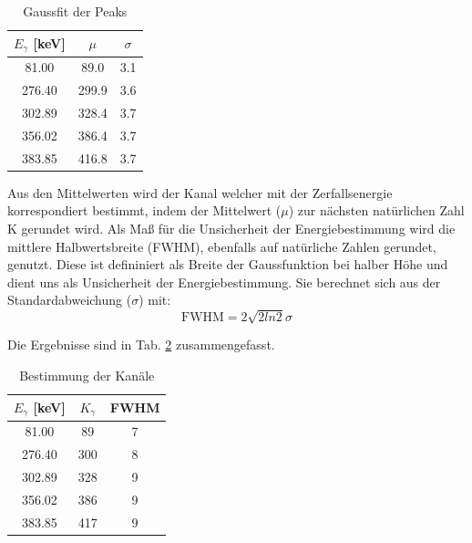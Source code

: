 \begin{table}[h]
\centering
\begin{tabular}{|c | c |c |}
\hline
$E_{\gamma}$ [\si{\kilo\electronvolt}]  & $\mu$ & $\sigma$ \\
\hline
81.00 & 89.0 & 3.1 \\
276.40 & 299.9 & 3.6 \\
302.89 & 328.4 & 3.7 \\
356.02 & 386.4 & 3.7 \\
383.85 & 416.8 & 3.7 \\
\hline
\end{tabular}
\caption{Gaussfit der Peaks}
\label{peaks}
\end{table}

Aus den Mittelwerten wird der Kanal welcher mit der Zerfallsenergie korrespondiert bestimmt, indem der Mittelwert ($\mu$) zur nächsten natürlichen Zahl K gerundet wird.
Als Maß für die Unsicherheit der Energiebestimmung wird die mittlere Halbwertsbreite (FWHM), ebenfalls auf natürliche Zahlen gerundet, genutzt.
Diese ist defininiert als Breite der Gaussfunktion bei halber Höhe und dient uns als Unsicherheit der Energiebestimmung.
Sie berechnet sich aus der Standardabweichung ($\sigma$) mit:
\begin{equation}
\text{FWHM} = 2 \sqrt{2 ln2} \sigma
\end{equation}

Die Ergebnisse sind in Tab. \ref{kanal} zusammengefasst.

\begin{table}[h]
\centering
\begin{tabular}{|c | c |c |}
\hline
$E_{\gamma}$ [\si{\kilo\electronvolt}]  & $K_{\gamma}$ & FWHM \\
\hline
81.00 & 89 & 7 \\
276.40 & 300 & 8 \\
302.89 & 328 & 9 \\
356.02 & 386 & 9 \\
383.85 & 417 & 9 \\
\hline
\end{tabular}
\caption{Bestimmung der Kanäle}
\label{kanal}
\end{table}

